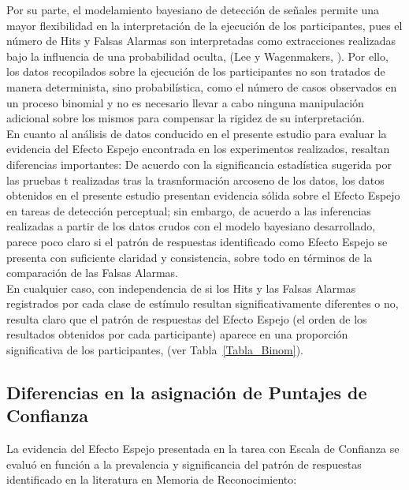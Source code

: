 Por su parte, el modelamiento bayesiano de detección de señales permite una mayor flexibilidad en la interpretación de la ejecución de los participantes, pues el número de Hits y Falsas Alarmas son interpretadas como extracciones realizadas bajo la influencia de una probabilidad oculta, (Lee y Wagenmakers, \citeyear{LeeBook}). Por ello, los datos recopilados sobre la ejecución de los participantes no son tratados de manera determinista, sino probabilística, como el número de casos observados en un proceso binomial y no es necesario llevar a cabo ninguna manipulación adicional sobre los mismos para compensar la rigidez de su interpretación.\\

En cuanto al análisis de datos conducido en el presente estudio para evaluar la evidencia del Efecto Espejo encontrada en los experimentos realizados, resaltan diferencias importantes: De acuerdo con la significancia estadística sugerida por las pruebas t realizadas tras la trasnformación arcoseno de los datos, los datos obtenidos en el presente estudio presentan evidencia sólida sobre el Efecto Espejo en tareas de detección perceptual; sin embargo, de acuerdo a las inferencias realizadas a partir de los datos crudos con el modelo bayesiano desarrollado, parece poco claro si el patrón de respuestas identificado como Efecto Espejo se presenta con suficiente claridad y consistencia, sobre todo en términos de la comparación de las Falsas Alarmas.\\

En cualquier caso, con independencia de si los Hits y las Falsas Alarmas registrados por cada clase de estímulo resultan significativamente diferentes o no, resulta claro que el patrón de respuestas del Efecto Espejo (el orden de los resultados obtenidos por cada participante) aparece en una proporción significativa de los participantes, (ver Tabla~\ref{Tabla_Binom}).\\ 















\subsection{Diferencias en la asignación de Puntajes de Confianza}

La evidencia del Efecto Espejo presentada en la tarea con Escala de Confianza se evaluó en función a la prevalencia y significancia del patrón de respuestas identificado en la literatura en Memoria de Reconocimiento:\\
 
